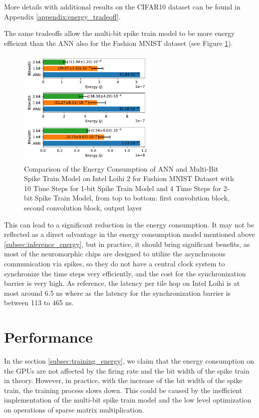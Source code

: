         More details with additional results on the CIFAR10 dataset can be found in Appendix \ref{appendix:energy_tradeoff}.

        The same tradeoffs allow the multi-bit spike train model to be more energy efficient than the ANN also for the Fashion MNIST dataset (see Figure \ref{fig:energy_ann_vs_snn_timesteps}).
        \begin{figure}[H]
            \centering
            \includegraphics[width=0.6\textwidth]{../timesteps/FashionMNIST/plots/fashionmnist_energy_ann_vs_snn.pdf}
            \caption{Comparison of the Energy Consumption of ANN and Multi-Bit Spike Train Model on Intel Loihi 2 for Fashion MNIST Dataset with 10 Time Steps for 1-bit Spike Train Model and 4 Time Steps for 2-bit Spike Train Model, from top to bottom: first convolution block, second convolution block, output layer}
            \label{fig:energy_ann_vs_snn_timesteps}
        \end{figure}

        This can lead to a significant reduction in the energy consumption. It may not be reflected as a direct advantage in the energy consumption model mentioned above \ref{subsec:inference_energy}, but in practice, it should bring significant benefits, as most of the neuromorphic chips are designed to utilize the asynchronous communication via spikes, so they do not have a central clock system to synchronize the time steps very efficiently, and the cost for the synchronization barrier is very high. As reference, the latency per tile hop on Intel Loihi is at most around 6.5 ns where as the latency for the synchronization barrier is between 113 to 465 ns. 

\section{Performance}
\label{sec:performance}
    In the section \ref{subsec:training_energy}, we claim that the energy consumption on the GPUs are not affected by the firing rate and the bit width of the spike train in theory. However, in practice, with the increase of the bit width of the spike train, the training process slows down. This could be caused by the inefficient implementation of the multi-bit spike train model and the low level optimization on operations of sparse matrix multiplication. 

